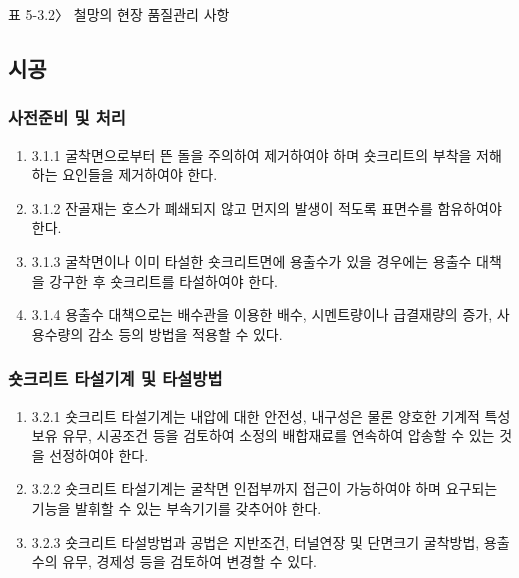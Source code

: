 표 5-3.2〉 철망의 현장 품질관리 사항

\newpage
\subsection{시공}

\subsubsection{사전준비 및 처리}
\begin{enumerate}
\item  3.1.1 굴착면으로부터 뜬 돌을 주의하여 제거하여야 하며 숏크리트의 부착을 저해하는 요인들을 제거하여야 한다.  
\item  3.1.2 잔골재는 호스가 폐쇄되지 않고 먼지의 발생이 적도록 표면수를 함유하여야 한다.  
\item  3.1.3 굴착면이나 이미 타설한 숏크리트면에 용출수가 있을 경우에는 용출수 대책을 강구한 후 숏크리트를 타설하여야 한다.  
\item  3.1.4 용출수 대책으로는 배수관을 이용한 배수, 시멘트량이나 급결재량의 증가, 사용수량의 감소 등의 방법을 적용할 수 있다.  
\end{enumerate}

\subsubsection{숏크리트 타설기계 및 타설방법}
\begin{enumerate}
\item  3.2.1 숏크리트 타설기계는 내압에 대한 안전성, 내구성은 물론 양호한 기계적 특성 보유 유무, 시공조건 등을 검토하여 소정의 배합재료를 연속하여 압송할 수 있는 것을 선정하여야 한다.  
\item  3.2.2 숏크리트 타설기계는 굴착면 인접부까지 접근이 가능하여야 하며 요구되는 기능을 발휘할 수 있는 부속기기를 갖추어야 한다.  
\item  3.2.3 숏크리트 타설방법과 공법은 지반조건, 터널연장 및 단면크기 굴착방법, 용출수의 유무, 경제성 등을 검토하여 변경할 수 있다.   
\end{enumerate}

